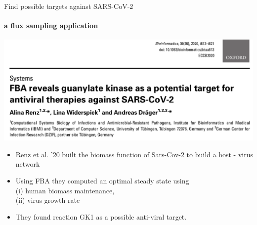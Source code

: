 \documentclass{beamer}
\begin{document}
   \begin{frame}{Find possible targets against SARS-CoV-2}
      \framesubtitle{a flux sampling application}
      \bigskip
      \includegraphics[scale=0.27]{../resources/covid_paper.png}
      
      \begin{singlespace}
         \begin{itemize}
            \item \small Renz et al. '20 built the biomass function of Sars-Cov-2 to build a host - virus network
            \item \small Using FBA they computed an optimal steady state using \\ \small \quad (i) human biomass maintenance,\\ \small \quad (ii) virus growth rate
            \item \small They found reaction GK1 as a possible anti-viral target.
         \end{itemize}            
      \end{singlespace}

   \end{frame}
\end{document}
